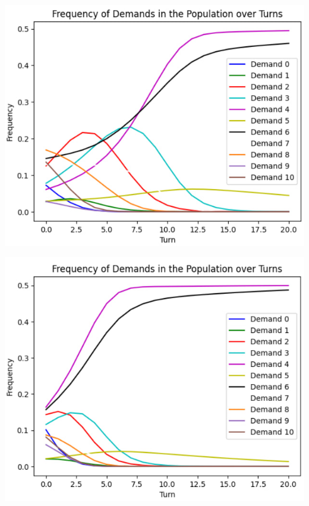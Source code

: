 \begin{center}
\includegraphics{18}
\end{center}

\begin{center}
\includegraphics{19}
\end{center}


